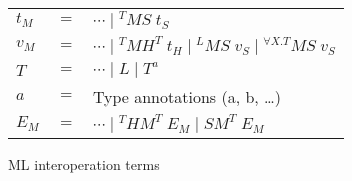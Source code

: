 \begin{figure}
\begin{center}
\begin{tabular}{lcl}
$t_{M}$ & $=$ & $\cdots\;\vert\;^{T}MS\;t_{S}$ \\
$v_{M}$ & $=$ & $\cdots\;\vert\;^{T}MH^{T}\;t_{H}\;\vert\;^{L}MS\;v_{S}\;\vert\;^{\forall X.T}MS\;v_{S}$ \\
$T$ & $=$ & $\cdots\;\vert\;L\;\vert\;T^{a}$ \\
$a$ & $=$ & Type annotations (a, b, \ldots) \\
$E_{M}$ & $=$ & $\cdots\;\vert\;^{T}HM^{T}\;E_{M}\;\vert\;SM^{T}\;E_{M}$
\end{tabular}
\end{center}
\caption{ML interoperation terms}
\label{fig:mit}
\end{figure}